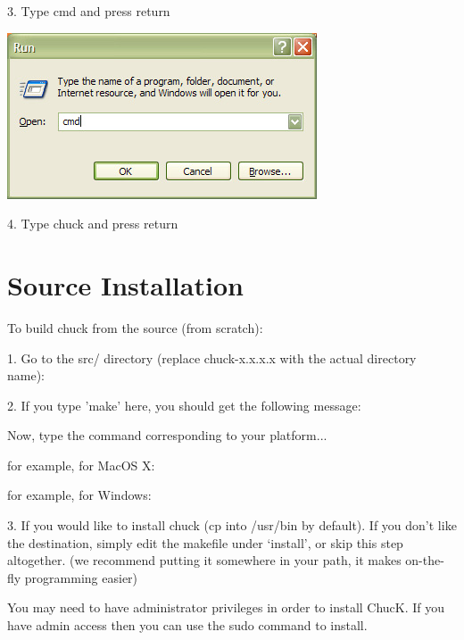 3. Type cmd and press return

\includegraphics{images/cmd}

4. Type chuck and press return

\section{Source Installation}

To build chuck from the source (from scratch): 

1. Go to the src/ directory (replace chuck-x.x.x.x with the actual 
directory name):



2. If you type 'make' here, you should get the following message:


Now, type the command corresponding to your platform... 

for example, for MacOS X:


for example, for Windows:


3. If you would like to install chuck (cp into /usr/bin by default). If you 
don't like the destination, simply edit the makefile under `install', or 
skip this step altogether. (we recommend putting it somewhere in your 
path, it makes on-the-fly programming easier)


You may need to have administrator privileges in order to install ChucK. If you 
have admin access then you can use the sudo command to install.

